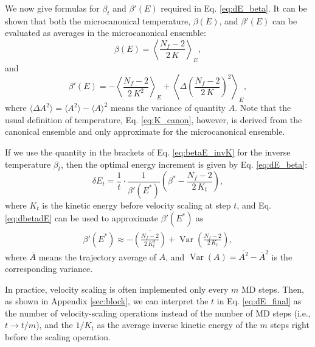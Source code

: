 \documentclass[preprint]{revtex4-1}
\begin{document}
We now give formulas for $\beta_t$
and $\beta'(E)$ required in Eq. \eqref{eq:dE_beta}.
%
It can be shown that both the microcanonical temperature, $\beta(E)$,
and $\beta'(E)$ can be evaluated as
averages in the microcanonical ensemble\cite{rugh1997, frenkel}:
%
\begin{equation}
  \beta(E)
  =
  \left\langle
    \frac{ N_f - 2 }
         { 2 \, K }
  \right\rangle_E
  ,
  \label{eq:betaE_invK}
\end{equation}
%
and
%
\begin{equation}
  \beta'(E)
  =
  - \left\langle
      \frac{ N_f - 2 }
           { 2 \, K^2 }
    \right\rangle_E
  + \left\langle
      \Delta\left(
        \frac{ N_f - 2 }
             { 2 \, K }
      \right)^2
    \right\rangle_E
  ,
  \label{eq:dbetadE}
\end{equation}
%
where
$\langle \Delta A^2 \rangle = \langle A^2 \rangle - \langle A \rangle^2$
means the variance of quantity $A$.
%
Note that the usual definition of temperature, Eq. \eqref{eq:K_canon},
however, is derived from the canonical ensemble and
only approximate for the microcanonical ensemble.



If we use the quantity in the brackets of
Eq. \eqref{eq:betaE_invK} for the inverse temperature
$\beta_t$,
then the optimal energy increment is given by
Eq. \eqref{eq:dE_beta}:
%
\begin{equation}
\delta E_t
=
\frac{ 1 } { t } \cdot
\frac{ 1 } { \beta'(E^*) }
\left(
 \beta^* -
 \frac{ N_f - 2  }
      { 2 \, K_t }
\right)
,
\label{eq:dE_final}
\end{equation}
%
where
$K_t$ is the kinetic energy before velocity scaling at step $t$,
and
Eq. \eqref{eq:dbetadE} can be used to approximate
$\beta'(E^*)$ as
%
\begin{align}
  \beta'(E^*)
  \approx
  - \overline{
    \left(
      \frac{ N_f - 2 }
           { 2 \, K_t^2 }
    \right)
    }
    +
    \operatorname{Var}
    \left(
        \frac{ N_f - 2 }
             { 2 \, K_t }
    \right)
  ,
  \label{eq:dbeta}
\end{align}
%
where
$\overline A$ means the trajectory average of $A$,
and
$\operatorname{Var}(A) = \overline{ A^2 } - {\overline A}^2$
is the corresponding variance.

In practice, velocity scaling is often implemented
only every $m$ MD steps.
%
Then,
as shown in Appendix \ref{sec:block},
we can interpret the $t$ in Eq. \eqref{eq:dE_final} as
the number of velocity-scaling operations instead of
the number of MD steps (i.e., $t \to t/m$), and
the $1/K_t$ as the average inverse kinetic energy
of the $m$ steps right
before the scaling operation.
\end{document}
